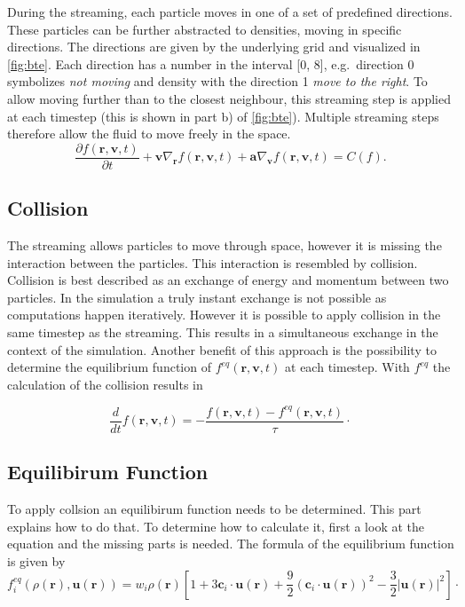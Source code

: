 During the streaming, each particle moves in one of a set of predefined directions.
These particles can be further abstracted to densities, moving in specific directions.
The directions are given by the underlying grid and visualized in \ref{fig:bte}.
Each direction has a number in the interval [0, 8], e.g.\ direction 0 symbolizes \textit{not moving} and density with the direction 1 \textit{move to the right}.
To allow moving further than to the closest neighbour, this streaming step is applied at each timestep (this is shown in part b) of \ref{fig:bte}).
Multiple streaming steps therefore allow the fluid to move freely in the space.
\begin{equation}
    \frac{\partial f\left(\mathbf{r},\mathbf{v},t\right)}{\partial t}+\mathbf{v}\nabla_{\mathbf{r}} f\left(\mathbf{r},\mathbf{v},t\right)
    +\mathbf{a}\nabla_{\mathbf{v}} f\left(\mathbf{r},\mathbf{v},t\right)=C(f).
\end{equation}

\subsection{Collision}
The streaming allows particles to move through space, however it is missing the interaction between the particles.
This interaction is resembled by collision.
Collision is best described as an exchange of energy and momentum between two particles.
In the simulation a truly instant exchange is not possible as computations happen iteratively.
However it is possible to apply collision in the same timestep as the streaming.
This results in a simultaneous exchange in the context of the simulation.
Another benefit of this approach is the possibility to determine the equilibrium function of \(f^{eq}\left(\mathbf{r},\mathbf{v},t\right)\) at each timestep.
With \(f^{eq}\) the calculation of the collision results in

\begin{equation}
    \frac{d}{dt} f\left(\mathbf{r},\mathbf{v},t\right) = -\frac{ f\left(\mathbf{r},\mathbf{v},t\right)- f^{eq}\left(\mathbf{r},\mathbf{v},t\right)}{\tau}
    \cdot
    \label{eq:bgk}\tag{1}
\end{equation}

\subsection{Equilibirum Function}
To apply collsion an equilibirum function needs to be determined.
This part explains how to do that.
To determine how to calculate it, first a look at the equation and the missing parts is needed.
The formula of the equilibrium function is given by
\begin{equation}
    f_i^{eq}(\rho(\mathbf{r}),\mathbf{u}(\mathbf{r}))=w_i\rho(\mathbf{r})
    \left[1
    +3\mathbf{c}_i\cdot\mathbf{u}(\mathbf{r})
    +\frac{9}{2}\left(\mathbf{c}_i\cdot\mathbf{u}(\mathbf{r})\right)^2
    -\frac{3}{2}|\mathbf{u}(\mathbf{r})|^2
    \right]
    \cdot
    \label{eq:feq}\tag{5}
\end{equation}

